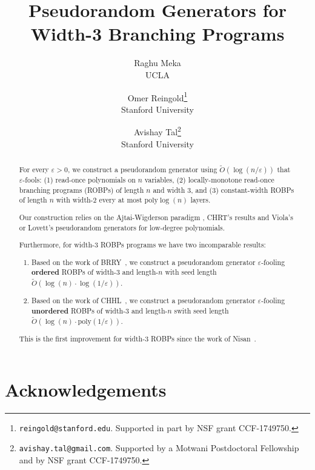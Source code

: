 \documentclass[12pt]{article}
\theoremstyle{plain}
\theoremstyle{remark}
\theoremstyle{plain}
\def\poly{{\mathrm{poly}}}
\newcommand{\eps}{\varepsilon}
\renewcommand{\tilde}{\widetilde}
\begin{document}
\title{Pseudorandom Generators for Width-3 Branching Programs}

\author{
Raghu Meka\\
\small UCLA\\
\and 
Omer Reingold\thanks{{\tt reingold@stanford.edu}. Supported in part by NSF grant CCF-1749750.
}\\
\small Stanford University\\
\and 
Avishay Tal\thanks{\texttt{avishay.tal@gmail.com}. Supported by a Motwani Postdoctoral Fellowship and by NSF grant CCF-1749750.
}\\
\small Stanford University\\
}

\maketitle

\begin{abstract}
For every $\eps>0$,
we construct a pseudorandom generator using $\tilde{O}(\log(n/\eps))$ that $\eps$-fools: (1) read-once polynomials on $n$ variables, (2) locally-monotone read-once branching programs (ROBPs) of length $n$ and width $3$, and (3) constant-width ROBPs of length $n$ with width-$2$ every at most $\poly\log(n)$ layers.

Our construction relies on the Ajtai-Wigderson paradigm \cite{AW85}, CHRT's results \cite{CHRT17} and Viola's \cite{Viola08} or Lovett's \cite{Lovett08} pseudorandom generators for low-degree polynomials.

Furthermore, for width-3 ROBPs programs we have two incomparable results:
\begin{enumerate}
	\item Based on the work of BRRY~\cite{BravermanRRY10}, we construct a pseudorandom generator $\eps$-fooling \textbf{ordered} ROBPs of width-$3$ and length-$n$ with seed length $\tilde{O}(\log(n) \cdot \log(1/\eps))$.
	\item Based on the work of CHHL~\cite{CHHL18}, we construct a pseudorandom generator $\eps$-fooling \textbf{unordered} ROBPs of width-$3$ and length-$n$ swith seed length $\tilde{O}(\log(n) \cdot \poly(1/\eps))$.
\end{enumerate}
This is the first improvement for width-$3$ ROBPs since the work of Nisan~\cite{Nisan92}.
\end{abstract}










\section*{Acknowledgements}






\end{document}
